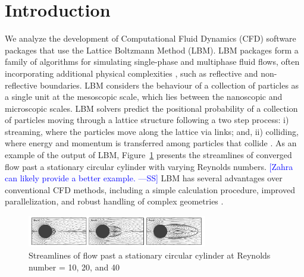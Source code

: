 \documentclass[final, 3p, times, authoryear]{elsarticle}
\newcommand{\authornote}[3]{\textcolor{#1}{[#3 ---#2]}}
\newcommand{\authornote}[3]{}
\newcommand{\wss}[1]{\authornote{blue}{SS}{#1}} %
\begin{document}

\section{Introduction} \label{secIntro}

We analyze the development of Computational Fluid Dynamics (CFD) software
packages that use the Lattice Boltzmann Method (LBM). LBM packages form a family
of algorithms for simulating single-phase and multiphase fluid flows, often
incorporating additional physical complexities \citep{chen1998lattice}, such as
reflective and non-reflective boundaries. LBM considers the behaviour of a
collection of particles as a single unit at the mesoscopic scale, which lies
between the nanoscopic and microscopic scales. LBM solvers predict the
positional probability of a collection of particles moving through a lattice
structure following a two step process: i) streaming, where the particles move
along the lattice via links; and, ii) colliding, where energy and momentum is
transferred among particles that collide \citep{bao2011lattice}. As an example
of the output of LBM, Figure~\ref{circularflow} presents the streamlines of
converged flow past a stationary circular cylinder with varying Reynolds
numbers. \wss{Zahra can likely provide a better example.}  LBM has several
advantages over conventional CFD methods, including a simple calculation
procedure, improved parallelization, and robust handling of complex geometries
\citep{ganji2015application}.

\begin{figure}[h!]
	\begin{center}
		\includegraphics[width=0.7\textwidth]{./figures/circularflow}
		\caption{Streamlines of flow past a stationary circular cylinder at
		Reynolds number = 10, 20, and 40 \citep{chen2021phase}}
		\label{circularflow}
	\end{center}
\end{figure}
\end{document}
